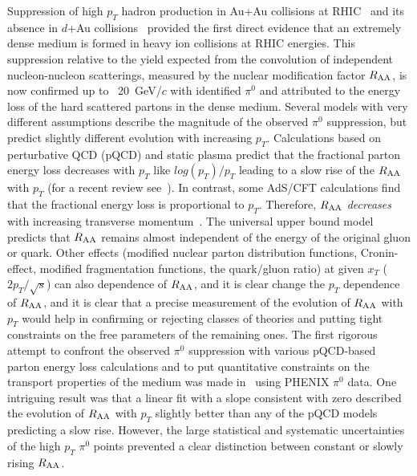 \documentclass[aps,prc,superscriptaddress,showpacs,nofootinbib,floatfix,twocolumn]{revtex4}
\def\pt{$p_T$}
\def\pts{$p_T$ }
\def\gevcs{~GeV/$c$ }
\def\raa{$R_{\rm AA}$}
\def\raas{$R_{\rm AA}$ }
\def\pizs{$\pi^{0}$ }
\begin{document}

\maketitle




Suppression of high \pts hadron production in Au+Au collisions at 
RHIC~\cite{ppg003,ppg080} and its absence in $d$+Au 
collisions~\cite{ppg028} provided the first direct evidence that an 
extremely dense medium is formed in heavy ion collisions at RHIC 
energies.  This suppression relative to the yield expected from the 
convolution of independent nucleon-nucleon scatterings, measured by 
the nuclear modification factor \raa, is now confirmed up to ~20\gevcs 
with identified \pizs and attributed to the energy loss of the hard 
scattered partons in the dense medium.  Several models with very 
different assumptions describe the magnitude of the observed \pizs 
suppression, but predict slightly different evolution with increasing 
\pt.  Calculations based on perturbative QCD (pQCD) and static plasma 
predict that the fractional parton energy loss decreases with \pts 
like $log(p_T)/p_T$ leading to a slow rise of the \raas with \pts (for 
a recent review see~\cite{bass2009}).  In contrast, some AdS/CFT 
calculations find that the fractional energy loss is proportional to 
\pt.  Therefore, \raas {\it decreases} with increasing transverse 
momentum~\cite{Liu2006,Horowitz2008,Chesler2009,Gubser2008}.  The 
universal upper bound model~\cite{Kharzeev2008} predicts that \raas 
remains almost independent of the energy of the original gluon or 
quark.  Other effects (modified nuclear parton distribution functions, 
Cronin-effect, modified fragmentation functions, the quark/gluon 
ratio) at given $x_T$ ($2p_T/\sqrt{s}$) can also %
dependence of \raa, and it is clear change the \pts dependence of 
\raa, and it is clear that a precise measurement of the evolution of 
\raas with \pts would help in confirming or rejecting classes of 
theories and putting tight constraints on the free parameters of the 
remaining ones.  The first rigorous attempt to confront the observed 
\pizs suppression with various pQCD-based parton energy loss 
calculations and to put quantitative constraints on the transport 
properties of the medium was made in~\cite{ppg079} using PHENIX \pizs 
data.  One intriguing result was that a linear fit with a slope 
consistent with zero described the evolution of \raas with \pts 
slightly better than any of the pQCD models predicting a slow rise.  
However, the large statistical and systematic uncertainties of the 
high \pts \pizs points prevented a clear distinction between constant 
or slowly rising \raa.
\end{document}
